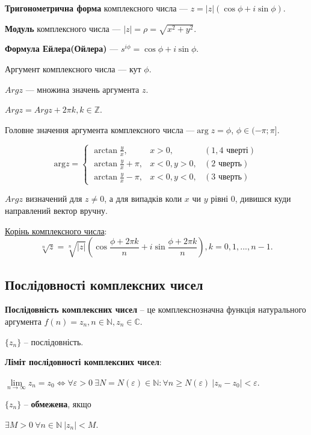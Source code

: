 \textbf{Тригонометрична форма} комплексного числа --- $z = |z| (\cos \phi + i \sin \phi)$.

\textbf{Модуль} комплексного числа --- $|z| = \rho = \sqrt{x^2 + y^2}$.

\textbf{Формула Ейлера(Ойлера)} --- $s^{i \phi} = \cos \phi + i \sin \phi$.

Аргумент комплексного числа --- кут $\phi$.

$Arg z$ --- множина значень аргумента $z$.

$Arg z =  Arg z + 2 \pi k, k \in \mathbb{Z}$.

Головне значення аргумента комплексного числа ---$\arg z =  \phi$, $\phi \in ( - \pi; \pi ]$.

$$\text{arg}z = \left\{ \begin{array}{lcr}
\arctan{\frac{y}{x}},       & x>0,      & (1, 4 \text{ чверті}) \\
\arctan{\frac{y}{x}} + \pi, & x<0, y>0, & (2 \text{ чверть}) \\
\arctan{\frac{y}{x}} - \pi, & x<0, y<0, & (3 \text{ чверть})
\end{array}\right. $$

$Arg z$ визначений для $z \neq 0$, а для випадків коли $x$ чи $y$ рівні 0, дивишся куди направлений вектор вручну.

\underline{Корінь комплексного числа}:
$$\sqrt[n]{z} = \sqrt[n]{|z|}(\cos\dfrac{\phi+2\pi k}{n} + i\sin\dfrac{\phi+2\pi k}{n}), k=0,1,...,n-1.$$



\subsection{Послідовності комплексних чисел}

\textbf{Послідовність комплексних чисел} -- це комплекснозначна функція натурального аргумента $f(n) = z_n, n\in\mathbb{N}, z_n\in\mathbb{C}$.

$\{z_n\}$ -- послідовність.

\textbf{Ліміт послідовності комплексних чисел}:

$\lim\limits_{n\rightarrow\infty} z_n = z_0 \Leftrightarrow \forall\varepsilon > 0 ~ \exists N = N ( \varepsilon ) \in\mathbb{N} : \forall n \geqslant N(\varepsilon) ~ |z_n-z_0|<\varepsilon$.

$\{z_n\}$ -- \textbf{обмежена}, якщо 

$\exists M>0 ~ \forall n \in \mathbb{N} ~ |z_n|<M$.

